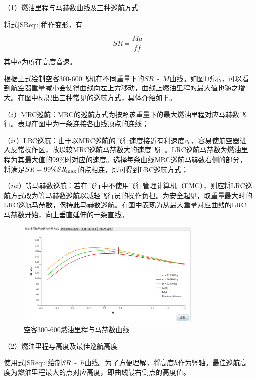 \documentclass[a4paper,punct,space,heading=true,AutoFakeBold]{ctexrep}
\begin{document}
（1）燃油里程与马赫数曲线及三种巡航方式

将式\ref{SRequ}稍作变形，有

\begin{equation}
SR=\frac{Ma}{ff}
\end{equation}

其中$a$为所在高度音速。

根据上式绘制空客300-600飞机在不同重量下的$SR$\ -\ $M$曲线。如图\ref{cruisetype}所示，可以看到航空器重量减小会使得曲线向左上方移动，曲线上燃油里程的最大值也随之增大。在图中标识出三种常见的巡航方式，具体介绍如下。

（$\romannumeral1$）MRC巡航：MRC的巡航方式为按照该重量下的最大燃油里程对应马赫数飞行。表现在图中为一条连接各曲线顶点的连线；

（$\romannumeral2$）LRC巡航：由于以MRC巡航的飞行速度接近有利速度$v_{\rm e}$，容易使航空器进入反常操作区，故以较MRC巡航马赫数大的速度飞行。LRC巡航马赫数为燃油里程为其最大值的99\%时对应的速度。选择每条曲线MRC巡航马赫数右侧的部分，将满足$SR=99\%SR_{\rm max}$的点相连，即可得到LRC巡航方式；

（$\romannumeral3$）等马赫数巡航：若在飞行中不使用飞行管理计算机（FMC），则应将LRC巡航方式改为等马赫数巡航以减轻飞行员的操作负担。为安全起见，取重量最大时的LRC巡航马赫数，保持此马赫数巡航。在图中表现为从最大重量对应曲线的LRC马赫数开始，向上垂直延伸的一条直线。

\begin{figure}[h]
	\centering
	\includegraphics[width=0.8\textwidth]{pic/cruisetype.eps}\hspace{30pt}
	\caption{空客300-600燃油里程与马赫数曲线}\label{cruisetype}
\end{figure}


（2）燃油里程与高度及最佳巡航高度

使用式\ref{SRequ}绘制$SR$\ -\ $h$曲线。为了方便理解，将高度$h$作为竖轴。最佳巡航高度为燃油里程最大的点对应高度，即曲线最右侧点的高度值。
\end{document}
